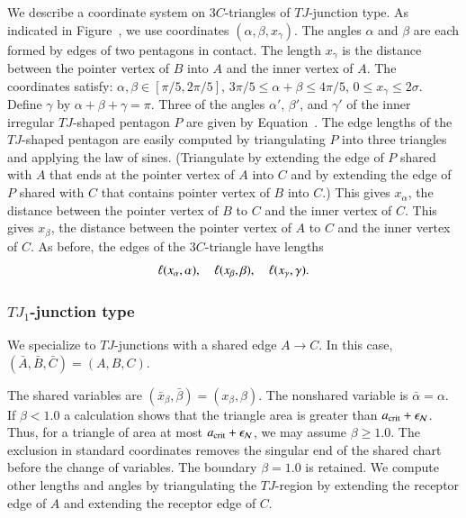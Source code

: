 We describe a coordinate system on $3C$-triangles of $TJ$-junction
type.  As indicated in Figure~, we use coordinates
$(\alpha,\beta,x_\gamma)$.  The angles $\alpha$ and $\beta$ are each
formed by edges of two pentagons in contact.  The length $x_\gamma$ is
the distance between the pointer vertex of $B$ into $A$ and the inner
vertex of $A$.  The coordinates satisfy:
$\alpha,\beta\in[\pi/5,2\pi/5]$, $3\pi/5\le \alpha+\beta\le 4\pi/5$,
$0\le x_\gamma\le 2\sigma$.  Define $\gamma$ by
$\alpha+\beta+\gamma=\pi$.  Three of the angles $\alpha'$, $\beta'$,
and $\gamma'$ of the inner irregular $TJ$-shaped pentagon $P$ are
given by Equation~.  The edge lengths of the $TJ$-shaped
pentagon are easily computed by triangulating $P$ into three triangles
and applying the law of sines.  (Triangulate by extending the edge of
$P$ shared with $A$ that ends at the pointer vertex of $A$ into $C$
and by extending the edge of $P$ shared with $C$ that contains pointer
vertex of $B$ into $C$.)  This gives $x_\alpha$, the distance between
the pointer vertex of $B$ to $C$ and the inner vertex of $C$.  This
gives $x_\beta$, the distance between the pointer vertex of $A$ to $C$
and the inner vertex of $C$.  As before, the edges of the
$3C$-triangle have lengths
\[
\ell(x_\alpha,\alpha),\quad \ell(x_\beta,\beta),\quad \ell(x_\gamma,\gamma).
\]


\subsubsection{$TJ_1$-junction type}

We specialize to $TJ$-junctions with a shared edge $A\to C$.  In this
case, $(\bar A,\bar B,\bar C)=(A,B,C)$.

The shared variables are $(\bar x_\beta,\bar\beta)=(x_\beta,\beta)$.
The nonshared variable is $\bar\alpha=\alpha$.  If $\beta < 1.0$ a
calculation %
shows that the triangle area is greater than $a_\text{crit}+\epsilon_{\mathcal N}$.
Thus, for a triangle of area at most $a_\text{crit}+\epsilon_{\mathcal N}$, we may assume $\beta\ge1.0$.
The exclusion in standard coordinates removes the singular end of the
shared chart before the change of variables. The boundary $\beta=1.0$
is retained.
We compute other lengths and angles by triangulating the $TJ$-region
by extending the receptor edge of $A$ and extending the receptor edge
of $C$.

